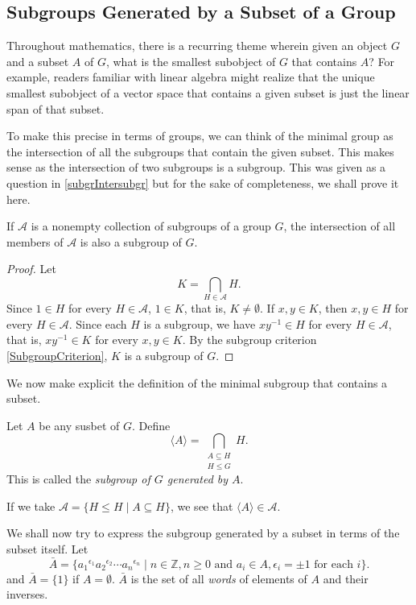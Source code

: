\subsection{Subgroups Generated by a Subset of a Group}

Throughout mathematics, there is a recurring theme wherein given an object $G$ and a subset $A$ of $G$, what is the smallest subobject of $G$ that contains $A$? For example, readers familiar with linear algebra might realize that the unique smallest subobject of a vector space that contains a given subset is just the linear span of that subset.

To make this precise in terms of groups, we can think of the minimal group as the intersection of all the subgroups that contain the given subset. This makes sense as the intersection of two subgroups is a subgroup. This was given as a question in \ref{subgrIntersubgr} but for the sake of completeness, we shall prove it here.

\begin{theorem}
\label{IntersectionOfSubgroups}
    If $\mathcal{A}$ is a nonempty collection of subgroups of a group $G$, the intersection of all members of $\mathcal{A}$ is also a subgroup of $G$.
\end{theorem}
\begin{proof}
    Let $$K=\bigcap_{H\in\mathcal{A}}H.$$
    Since $1\in H$ for every $H\in\mathcal{A}$, $1\in K$, that is, $K\neq\emptyset$. If $x,y\in K$, then $x,y\in H$ for every $H\in\mathcal{A}$. Since each $H$ is a subgroup, we have $xy^{-1}\in H$ for every $H\in\mathcal{A}$, that is, $xy^{-1}\in K$ for every $x,y\in K$. By the subgroup criterion \ref{SubgroupCriterion}, $K$ is a subgroup of $G$.
\end{proof}

We now make explicit the definition of the minimal subgroup that contains a subset.
\begin{definition}
    Let $A$ be any susbet of $G$. Define
    $$\langle A\rangle=\bigcap_{\substack{A\subseteq H \\ H\leq G}}H.$$
    This is called the \textit{subgroup of $G$ generated by $A$}.
\end{definition}

If we take $\mathcal{A}=\{H\leq H\mid A\subseteq H\}$, we see that $\langle A\rangle\in\mathcal{A}$.

We shall now try to express the subgroup generated by a subset in terms of the subset itself. Let
$$\bar{A} = \{{a_1}^{\epsilon_1}{a_2}^{\epsilon_2}\cdots{a_n}^{\epsilon_n}\mid  n\in\mathbb{Z}, n\geq0\text{ and }a_i\in A,\epsilon_i=\pm1\text{ for each }i\}.$$
and $\bar A=\{1\}$ if $A=\emptyset$. $\bar A$ is the set of all \textit{words} of elements of $A$ and their inverses.

